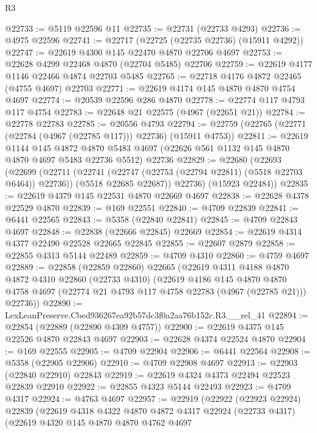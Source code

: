 \begin{lexlean}{R3}
\begin{coremodule}
@22733 := @5119 @22596 @11
@22735 := @22731 (@22733 @4293)
@22736 := @4975 @22596
@22741 := @22717 (@22725 (@22735 @22736) (@15911 @4292))
@22747 := @22619 @4300 @145 @22470 @4870 @22706 @4697
@22753 := @22628 @4299 @22468 @4870 (@22704 @5485) @22706
@22759 := @22619 @4177 @1146 @22466 @4874 @22703 @5485
@22765 := @22718 @4176 @4872 @22465 (@4755 @4697) @22703
@22771 := @22619 @4174 @145 @4870 @4870 @4754 @4697
@22774 := @20539 @22596 @286 @4870
@22778 := @22774 @117 @4793 @117 @4754
@22783 := @22648 @21 @22575 (@4967 (@22651 @21))
@22784 := @22778 @22783
@22785 := @20556 @4793
@22794 := @22759 (@22765 (@22771 (@22784 (@4967 (@22785 @117))) @22736) (@15911 @4753))
@22811 := @22619
    @1144
    @145
    @4872
    @4870
    @5483
    @4697
    (@22626 @561 @1132 @145 @4870 @4870 @4697 @5483 @22736 @5512)
    @22736
@22829 := @22680
    (@22693
      (@22699
        (@22711
          (@22741 (@22747 (@22753 (@22794 @22811) (@5518 @22703 @6464)) @22736))
          (@5518 @22685 @22687))
        @22736)
      (@15923 @22484))
@22835 := @22619 @4379 @145 @22531 @4870 @22669 @4697
@22838 := @22628 @4378 @22529 @4870
@22839 := @169 @22551
@22840 := @4709 @22839
@22841 := @6441 @22565
@22843 := @5358 (@22840 @22841)
@22845 := @4709 @22843 @4697
@22848 := @22838 (@22666 @22845) @22669
@22854 := @22619 @4314 @4377 @22490 @22528 @22665 @22845
@22855 := @22607 @2879
@22858 := @22855 @4313 @5144 @22489
@22859 := @4709 @4310
@22860 := @4759 @4697
@22889 := @22858
    (@22859 @22860)
    @22665
    (@22619
      @4311
      @4188
      @4870
      @4872
      @4310
      @22860
      (@22733 @4310)
      (@22619
        @4186
        @145
        @4870
        @4870
        @4758
        @4697
        (@22774 @21 @4793 @117 @4758 @22783 (@4967 (@22785 @21)))
        @22736))
@22890 := LexLeanPreserve.Cbed936267ea92b57dc3f0a2aa76b152c.R3.__rel_41
@22894 := @22854 (@22889 (@22890 @4309 @4757))
@22900 := @22619 @4375 @145 @22526 @4870 @22843 @4697
@22903 := @22628 @4374 @22524 @4870
@22904 := @169 @22555
@22905 := @4709 @22904
@22906 := @6441 @22564
@22908 := @5358 (@22905 @22906)
@22910 := @4709 @22908 @4697
@22913 := @22903 (@22840 @22910) @22843
@22919 := @22619 @4324 @4373 @22494 @22523 @22839 @22910
@22922 := @22855 @4323 @5144 @22493
@22923 := @4709 @4317
@22924 := @4763 @4697
@22957 := @22919
    (@22922
      (@22923 @22924)
      @22839
      (@22619
        @4318
        @4322
        @4870
        @4872
        @4317
        @22924
        (@22733 @4317)
        (@22619
          @4320
          @145
          @4870
          @4870
          @4762
          @4697

\end{coremodule}
\end{lexlean}
